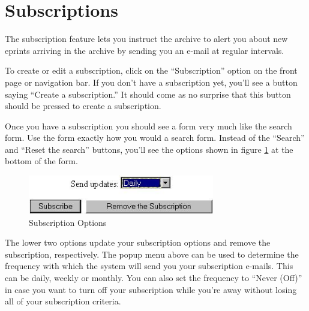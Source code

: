 \section{Subscriptions}


The subscription feature lets you instruct the archive to alert you about new eprints arriving in the archive by sending you an e-mail at regular intervals.

To create or edit a subscription, click on the ``Subscription'' option on the front page or navigation bar. If you don't have a subscription yet, you'll see a button saying ``Create a subscription.'' It should come as no surprise that this button should be pressed to create a subscription.

Once you have a subscription you should see a form very much like the search form. Use the form exactly how you would a search form. Instead of the ``Search'' and ``Reset the search'' buttons, you'll see the options shown in figure \ref{subscription_options} at the bottom of the form.

\begin{figure}
\centerline{\includegraphics[width=3.2in]{images/subscription-options}}
\caption{\label{subscription_options} Subscription Options}
\end{figure}

The lower two options update your subscription options and remove the subscription, respectively. The popup menu above can be used to determine the frequency with which the system will send you your subscription e-mails. This can be daily, weekly or monthly. You can also set the frequency to ``Never (Off)'' in case you want to turn off your subscription while you're away without losing all of your subscription criteria.
